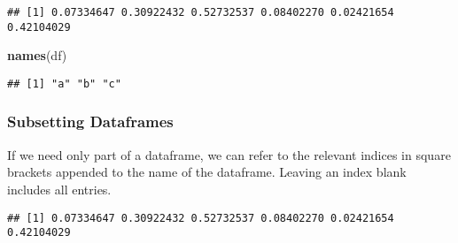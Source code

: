 \documentclass[11pt,]{article}
\newenvironment{Shaded}{\begin{snugshade}}{\end{snugshade}}
\newcommand{\KeywordTok}[1]{\textcolor[rgb]{0.13,0.29,0.53}{\textbf{#1}}}
\newcommand{\DataTypeTok}[1]{\textcolor[rgb]{0.13,0.29,0.53}{#1}}
\newcommand{\DecValTok}[1]{\textcolor[rgb]{0.00,0.00,0.81}{#1}}
\newcommand{\StringTok}[1]{\textcolor[rgb]{0.31,0.60,0.02}{#1}}
\newcommand{\CommentTok}[1]{\textcolor[rgb]{0.56,0.35,0.01}{\textit{#1}}}
\newcommand{\OperatorTok}[1]{\textcolor[rgb]{0.81,0.36,0.00}{\textbf{#1}}}
\newcommand{\NormalTok}[1]{#1}
\begin{document}
\begin{Shaded}
\end{Shaded}

\begin{verbatim}
## [1] 0.07334647 0.30922432 0.52732537 0.08402270 0.02421654 0.42104029
\end{verbatim}

\begin{Shaded}
\begin{Highlighting}[]
\KeywordTok{names}\NormalTok{(df)}
\end{Highlighting}
\end{Shaded}

\begin{verbatim}
## [1] "a" "b" "c"
\end{verbatim}

\subsubsection{Subsetting Dataframes}\label{subsetting-dataframes}

If we need only part of a dataframe, we can refer to the relevant
indices in square brackets appended to the name of the dataframe.
Leaving an index blank includes all entries.

\begin{Shaded}
\end{Shaded}

\begin{verbatim}
## [1] 0.07334647 0.30922432 0.52732537 0.08402270 0.02421654 0.42104029
\end{verbatim}
\end{document}
